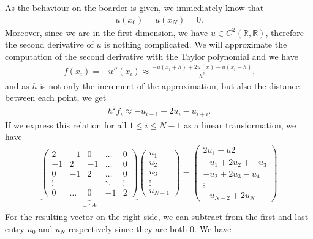 As the behaviour on the boarder is given, we immediately know that
\begin{align*}
    u(x_0) = u(x_N) = 0 \text{.}
\end{align*}
Moreover, since we are in the first dimension, we have \(u \in C^2(\mathbb{R}, \mathbb{R})\), therefore the second derivative of \(u\) is nothing complicated. We will approximate the computation of the second derivative with the Taylor polynomial and we have
\begin{align*}
    f(x_i) = -u''(x_i) \approx \frac{-u(x_i + h) + 2u(x) - u(x_i - h)}{h^2} \text{,}
\end{align*}
and as \(h\) is not only the increment of the approximation, but also the distance between each point, we get
\begin{align*}
    h^2 f_i \approx -u_{i - 1} + 2u_i - u_{i + i} \text{.}
\end{align*}
If we express this relation for all \(1 \leq i \leq N - 1\) as a linear transformation, we have
\begin{align*}
    \underbrace{
    \begin{pmatrix}
        2  & -1 &  0 & \dots & 0 \\
        -1 &  2 & -1 & \dots & 0 \\
        0  & -1 &  2 & \dots & 0 \\
        \vdots & & & \ddots & \vdots \\
        0 & \dots & 0 & -1 & 2
    \end{pmatrix}
    }_{=: A_1}
    \begin{pmatrix}
        u_1 \\ u_2 \\ u_3 \\ \vdots \\ u_{N-1}
    \end{pmatrix}
    =
    \begin{pmatrix}
        2u_1 - u2 \\
        -u_1 + 2u_2 + -u_3 \\
        -u_2 + 2 u_3 - u_4 \\
        \vdots \\
        -u_{N-2} + 2 u_N
    \end{pmatrix}
\end{align*}
For the resulting vector on the right side, we can subtract from the first and last entry \(u_0\) and \(u_N\) respectively since they are both \(0\). We have
